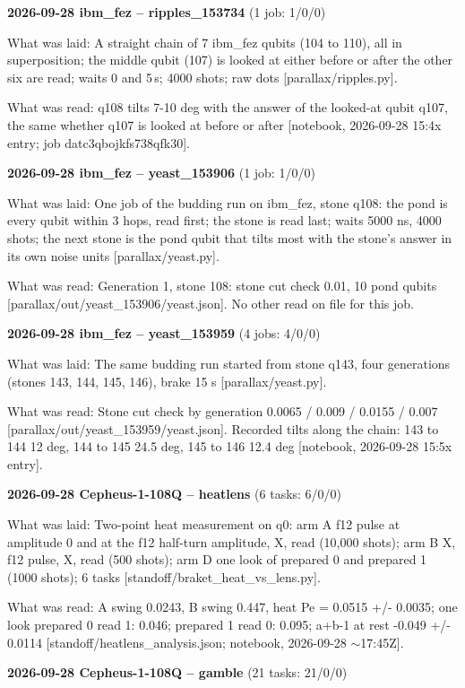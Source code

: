 \documentclass[11pt]{article}
\begin{document}
\textbf{2026-09-28 ibm\_fez -- ripples\_153734} (1 job: 1/0/0)

What was laid: A straight chain of 7 ibm\_fez qubits (104 to 110), all in superposition; the middle qubit (107) is looked at either before or after the other six are read; waits 0 and 5\,\textmu s; 4000 shots; raw dots {[}parallax/ripples.py{]}.

What was read: q108 tilts 7-10 deg with the answer of the looked-at qubit q107, the same whether q107 is looked at before or after {[}notebook, 2026-09-28 15:4x entry; job datc3qbojkfs738qfk30{]}.

\textbf{2026-09-28 ibm\_fez -- yeast\_153906} (1 job: 1/0/0)

What was laid: One job of the budding run on ibm\_fez, stone q108: the pond is every qubit within 3 hops, read first; the stone is read last; waits 5000 ns, 4000 shots; the next stone is the pond qubit that tilts most with the stone's answer in its own noise units {[}parallax/yeast.py{]}.

What was read: Generation 1, stone 108: stone cut check 0.01, 10 pond qubits {[}parallax/out/yeast\_153906/yeast.json{]}. No other read on file for this job.

\textbf{2026-09-28 ibm\_fez -- yeast\_153959} (4 jobs: 4/0/0)

What was laid: The same budding run started from stone q143, four generations (stones 143, 144, 145, 146), brake 15 s {[}parallax/yeast.py{]}.

What was read: Stone cut check by generation 0.0065 / 0.009 / 0.0155 / 0.007 {[}parallax/out/yeast\_153959/yeast.json{]}. Recorded tilts along the chain: 143 to 144 12 deg, 144 to 145 24.5 deg, 145 to 146 12.4 deg {[}notebook, 2026-09-28 15:5x entry{]}.

\textbf{2026-09-28 Cepheus-1-108Q -- heatlens} (6 tasks: 6/0/0)

What was laid: Two-point heat measurement on q0: arm A f12 pulse at amplitude 0 and at the f12 half-turn amplitude, X, read (10,000 shots); arm B X, f12 pulse, X, read (500 shots); arm D one look of prepared 0 and prepared 1 (1000 shots); 6 tasks {[}standoff/braket\_heat\_vs\_lens.py{]}.

What was read: A swing 0.0243, B swing 0.447, heat Pe = 0.0515 +/- 0.0035; one look prepared 0 read 1: 0.046; prepared 1 read 0: 0.095; a+b-1 at rest -0.049 +/- 0.0114 {[}standoff/heatlens\_analysis.json; notebook, 2026-09-28 \(\sim\)17:45Z{]}.

\textbf{2026-09-28 Cepheus-1-108Q -- gamble} (21 tasks: 21/0/0)
\end{document}
